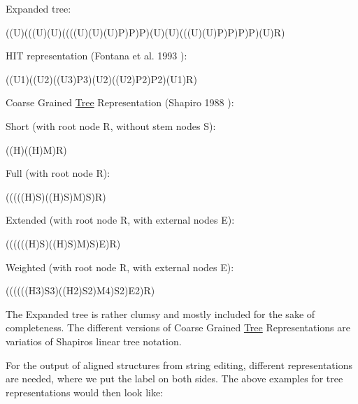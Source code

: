 \begin{DoxyItemize}
\item Expanded tree\+: \begin{DoxyVerb}((U)(((U)(U)((((U)(U)(U)P)P)P)(U)(U)(((U)(U)P)P)P)P)(U)R) \end{DoxyVerb}

\item H\+IT representation (Fontana et al. 1993 \cite{fontana:1993b})\+: \begin{DoxyVerb}((U1)((U2)((U3)P3)(U2)((U2)P2)P2)(U1)R) \end{DoxyVerb}

\item Coarse Grained \hyperlink{structTree}{Tree} Representation (Shapiro 1988 \cite{shapiro:1988})\+:
\begin{DoxyItemize}
\item Short (with root node {\ttfamily R}, without stem nodes {\ttfamily S})\+: \begin{DoxyVerb}((H)((H)M)R) \end{DoxyVerb}

\item Full (with root node {\ttfamily R})\+: \begin{DoxyVerb}(((((H)S)((H)S)M)S)R) \end{DoxyVerb}

\item Extended (with root node {\ttfamily R}, with external nodes {\ttfamily E})\+: \begin{DoxyVerb}((((((H)S)((H)S)M)S)E)R) \end{DoxyVerb}

\item Weighted (with root node {\ttfamily R}, with external nodes {\ttfamily E})\+: \begin{DoxyVerb}((((((H3)S3)((H2)S2)M4)S2)E2)R) \end{DoxyVerb}

\end{DoxyItemize}
\end{DoxyItemize}

The Expanded tree is rather clumsy and mostly included for the sake of completeness. The different versions of Coarse Grained \hyperlink{structTree}{Tree} Representations are variatios of Shapiro\textquotesingle{}s linear tree notation.

For the output of aligned structures from string editing, different representations are needed, where we put the label on both sides. The above examples for tree representations would then look like\+:


